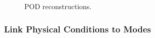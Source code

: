 \documentclass[9pt]{beamer}
\begin{document}
\begin{frame}
\begin{figure}
      \vspace*{-0.5cm}
      \vspace*{0cm}\caption{POD reconstructions.}
\end{figure}
\end{frame}
\begin{frame}
\frametitle{Link Physical Conditions to Modes}
\label{sec-2-6}


\end{frame}
\end{document}
